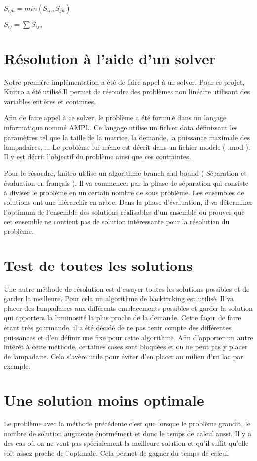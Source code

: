 $
S_{ijn}=min(S_{in},S_{jn})
$

$
S_{ij}=\sum{S_{ijn}}
$

\section{Résolution à l'aide d'un solver}
Notre première implémentation a été de faire appel à un solver. Pour ce projet, Knitro a été utilisé.Il permet de résoudre des problèmes non linéaire utilisant des variables entières et continues.

Afin de faire appel à ce solver, le problème a été formulé dans un langage informatique nommé AMPL. Ce langage utilise un fichier data définissant les paramètres tel que la taille de la matrice, la demande, la puissance maximale des lampadaires, ... 
Le problème lui même est décrit dans un fichier modèle ( .mod ). Il y est décrit l'objectif du problème ainsi que ces contraintes.

Pour le résoudre, knitro utilise un algorithme branch and bound ( Séparation et évaluation en français ).
Il va commencer par la phase de séparation qui consiste à diviser le problème en un certain nombre de sous problème. Les ensembles de solutions ont une hiérarchie en arbre. Dans la phase d'évaluation, il va déterminer l'optimum de l'ensemble des solutions réalisables d'un ensemble ou prouver que cet ensemble ne contient pas de solution intéressante pour la résolution du problème\cite{branchbound}.


\section{Test de toutes les solutions}
Une autre méthode de résolution est d'essayer toutes les solutions possibles et de garder la meilleure. Pour cela un algorithme de backtraking est utilisé. Il va placer des lampadaires aux différents emplacements possibles et garder la solution qui apportera la luminosité la plus proche de la demande.
Cette façon de faire étant très gourmande, il a été décidé de ne pas tenir compte des différentes puissances et d'en définir une fixe pour cette algorithme. Afin d'apporter un autre intérêt à cette méthode,  certaines cases sont bloquées et on ne peut pas y placer de lampadaire. Cela s'avère utile pour éviter d'en placer au milieu d'un lac par exemple.

\section{Une solution moins optimale}
Le problème avec la méthode précédente c'est que lorsque le problème grandit, le nombre de solution augmente énormément et donc le temps de calcul aussi. Il y a des cas où on ne veut pas spécialement la meilleure solution et qu'il suffit qu'elle soit assez proche de l'optimale. Cela permet de gagner du temps de calcul. 


